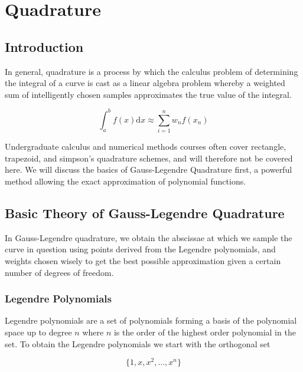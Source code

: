 


	
\chapter{Quadrature}
\label{ch:quadrature}


\section{Introduction}
\label{sec:quadratureintro}

In general, quadrature is a process by which the calculus problem of determining the integral of a curve is cast as a linear algebra problem whereby a weighted sum of intelligently chosen samples approximates the true value of the integral.

\begin{equation} \int_{a}^{b} f(x) \mathrm{d}x \approx \sum_{i=1}^n w_n f(x_n) \end{equation}

Undergraduate calculus and numerical methods courses often cover rectangle, trapezoid, and simpson's quadrature schemes, and will therefore not be covered here. We will discuss the basics of Gauss-Legendre Quadrature first, a powerful method allowing the exact approximation of polynomial functions.

\section{Basic Theory of Gauss-Legendre Quadrature}
In Gauss-Legendre quadrature, we obtain the abscissae at which we sample the curve in question using points derived from the Legendre polynomials, and weights chosen wisely to get the best possible approximation given a certain number of degrees of freedom.

\subsection{Legendre Polynomials}
Legendre polynomials are a set of polynomials forming a basis of the polynomial space up to degree $n$ where $n$ is the order of the highest order polynomial in the set. To obtain the Legendre polynomials we start with the orthogonal set

\begin{equation}  \{ 1, x, x^2, \ldots , x^n \}  \end{equation}


